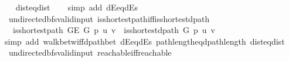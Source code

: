 \begin{isabellebody}
\endisataginvisible
{\isafoldinvisible}%
%
\isadeliminvisible
\isanewline
%
\endisadeliminvisible
%
\isadelimproof
\ \ %
\endisadelimproof
%
\isatagproof
{}\isamarkupfalse%
\ dist{\isacharunderscore}{\kern0pt}eq{\isacharunderscore}{\kern0pt}dist\isanewline
\ \ \isamarkupfalse%
\ {\isacharparenleft}{\kern0pt}simp\ add{\isacharcolon}{\kern0pt}\ dE{\isacharunderscore}{\kern0pt}eq{\isacharunderscore}{\kern0pt}dEs{\isacharparenright}{\kern0pt}%
\endisatagproof
{\isafoldproof}%
%
\isadelimproof
\isanewline
%
\endisadelimproof
%
\isadeliminvisible
\isanewline
%
\endisadeliminvisible
%
\isataginvisible
{}\isamarkupfalse%
\ {\isacharparenleft}{\kern0pt}\ undirected{\isacharunderscore}{\kern0pt}bfs{\isacharunderscore}{\kern0pt}valid{\isacharunderscore}{\kern0pt}input{\isacharparenright}{\kern0pt}\ is{\isacharunderscore}{\kern0pt}shortest{\isacharunderscore}{\kern0pt}path{\isacharunderscore}{\kern0pt}iff{\isacharunderscore}{\kern0pt}is{\isacharunderscore}{\kern0pt}shortest{\isacharunderscore}{\kern0pt}dpath{\isacharcolon}{\kern0pt}\isanewline
\ \ \ {\isachardoublequoteopen}is{\isacharunderscore}{\kern0pt}shortest{\isacharunderscore}{\kern0pt}path\ {\isacharparenleft}{\kern0pt}G{\isachardot}{\kern0pt}E\ G{\isacharparenright}{\kern0pt}\ p\ u\ v\ {\isasymlongleftrightarrow}\ is{\isacharunderscore}{\kern0pt}shortest{\isacharunderscore}{\kern0pt}dpath\ G\ p\ u\ v{\isachardoublequoteclose}%
\endisataginvisible
{\isafoldinvisible}%
%
\isadeliminvisible
\isanewline
%
\endisadeliminvisible
%
\isadelimproof
\ \ %
\endisadelimproof
%
\isatagproof
{}\isamarkupfalse%
\ {\isacharparenleft}{\kern0pt}simp\ add{\isacharcolon}{\kern0pt}\ walk{\isacharunderscore}{\kern0pt}betw{\isacharunderscore}{\kern0pt}iff{\isacharunderscore}{\kern0pt}dpath{\isacharunderscore}{\kern0pt}bet\ dE{\isacharunderscore}{\kern0pt}eq{\isacharunderscore}{\kern0pt}dEs\ path{\isacharunderscore}{\kern0pt}length{\isacharunderscore}{\kern0pt}eq{\isacharunderscore}{\kern0pt}dpath{\isacharunderscore}{\kern0pt}length\ dist{\isacharunderscore}{\kern0pt}eq{\isacharunderscore}{\kern0pt}dist{\isacharparenright}{\kern0pt}%
\endisatagproof
{\isafoldproof}%
%
\isadelimproof
\isanewline
%
\endisadelimproof
%
\isadeliminvisible
\isanewline
%
\endisadeliminvisible
%
\isataginvisible
{}\isamarkupfalse%
\ {\isacharparenleft}{\kern0pt}\ undirected{\isacharunderscore}{\kern0pt}bfs{\isacharunderscore}{\kern0pt}valid{\isacharunderscore}{\kern0pt}input{\isacharparenright}{\kern0pt}\ reachable{\isacharunderscore}{\kern0pt}iff{\isacharunderscore}{\kern0pt}reachable{\isacharcolon}{\kern0pt}\isanewline

\end{isabellebody}
